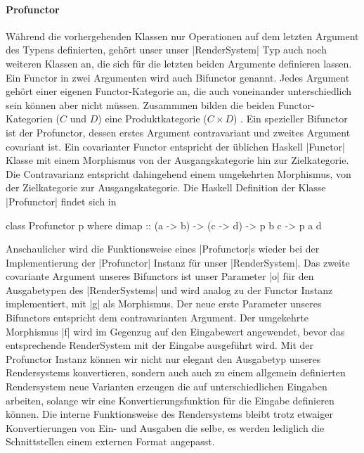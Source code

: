 
\paragraph{Profunctor}
Während die vorhergehenden Klassen nur Operationen auf dem letzten Argument des Typens definierten, gehört unser unser |RenderSystem| Typ auch noch weiteren Klassen an, die sich für die letzten beiden Argumente definieren lassen. Ein Functor in zwei Argumenten wird auch Bifunctor genannt. Jedes Argument gehört einer eigenen Functor-Kategorie an, die auch voneinander unterschiedlich sein können aber nicht müssen. Zusammmen bilden die beiden Functor-Kategorien ($C$ und $D$) eine Produktkategorie ($C \times D$) \parencite{MacLane1998}. Ein spezieller Bifunctor ist der Profunctor, dessen erstes Argument contravariant und zweites Argument covariant ist. Ein covarianter Functor entspricht der üblichen Haskell |Functor| Klasse mit einem Morphismus von der Ausgangskategorie hin zur Zielkategorie. Die Contravarianz entspricht dahingehend einem umgekehrten Morphismus, von der Zielkategorie zur Ausgangskategorie. Die Haskell Definition der Klasse |Profunctor| findet sich in 

\begin{haskell}[label={lst:class-profunctor},caption={Profunctor Klasse\protect\footnotemark},nolol]
class Profunctor p where
  dimap :: (a -> b) -> (c -> d) -> p b c -> p a d
\end{haskell}

Anschaulicher wird die Funktionsweise eines |Profunctor|s wieder bei der Implementierung der |Profunctor| Instanz für unser |RenderSystem|. Das zweite covariante Argument unseres Bifunctors ist unser Parameter |o| für den Ausgabetypen des |RenderSystems| und wird analog zu der Functor Instanz implementiert, mit |g| als Morphismus. Der neue erste Parameter unseres Bifunctors entspricht dem contravarianten Argument. Der umgekehrte Morphismus |f| wird im Gegenzug auf den Eingabewert angewendet, bevor das entsprechende RenderSystem mit der Eingabe ausgeführt wird. Mit der Profunctor Instanz können wir nicht nur elegant den Ausgabetyp unseres Rendersystems konvertieren, sondern auch auch zu einem allgemein definierten Rendersystem neue Varianten erzeugen die auf unterschiedlichen Eingaben arbeiten, solange wir eine Konvertierungsfunktion für die Eingabe definieren können. Die interne Funktionsweise des Rendersystems bleibt trotz etwaiger Konvertierungen von Ein- und Ausgaben die selbe, es werden lediglich die Schnittstellen einem externen Format angepasst.

